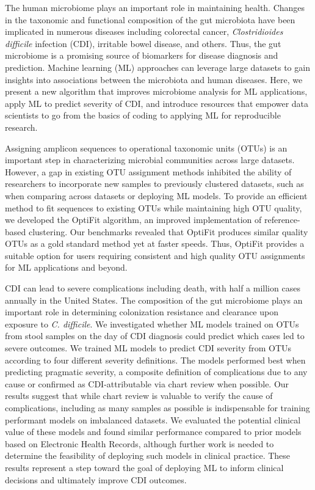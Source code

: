 The human microbiome plays an important role in maintaining health.
Changes in the taxonomic and functional composition of the gut microbiota have
been implicated in numerous diseases including colorectal cancer,
\textit{Clostridioides difficile} infection (CDI), irritable bowel disease, and
others.
Thus, the gut microbiome is a promising source of biomarkers for disease
diagnosis and prediction.
Machine learning (ML) approaches can leverage large datasets to gain insights
into associations between the microbiota and human diseases.
Here, we present a new algorithm that improves microbiome analysis for ML applications,
apply ML to predict severity of CDI,
and introduce resources that empower data scientists to go from the basics of
coding to applying ML for reproducible research.

Assigning amplicon sequences to operational taxonomic units (OTUs) is an
important step in characterizing microbial communities across large datasets.
However, a gap in existing OTU assignment methods inhibited the ability of
researchers to incorporate new samples to previously clustered datasets,
such as when comparing across datasets or deploying ML models.
To provide an efficient method to fit sequences to existing OTUs while
maintaining high OTU quality, we developed the OptiFit algorithm, an improved
implementation of reference-based clustering.
Our benchmarks revealed that OptiFit produces similar quality OTUs as a gold
standard method yet at faster speeds.
Thus, OptiFit provides a suitable option for users requiring consistent and
high quality OTU assignments for ML applications and beyond.

CDI can lead to severe complications including death, with half a million cases
annually in the United States.
The composition of the gut microbiome plays an important role in determining
colonization resistance and clearance upon exposure to \textit{C. difficile}.
We investigated whether ML models trained on OTUs from stool samples on
the day of CDI diagnosis could predict which cases led to severe outcomes.
We trained ML models to predict CDI severity from OTUs
according to four different severity definitions.
The models performed best when predicting pragmatic severity, a composite
definition of complications due to any cause or confirmed as CDI-attributable
via chart review when possible.
Our results suggest that while chart review is valuable to verify the cause of
complications, including as many samples as possible is indispensable for
training performant models on imbalanced datasets.
We evaluated the potential clinical value of these models and found
similar performance compared to prior models based on Electronic Health Records,
although further work is needed to determine the feasibility of deploying such
models in clinical practice.
These results represent a step toward the goal of deploying ML to
inform clinical decisions and ultimately improve CDI outcomes.

